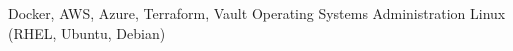 {Docker, AWS, Azure, Terraform, Vault}
{Operating Systems Administration}
{Linux (RHEL, Ubuntu, Debian)}
